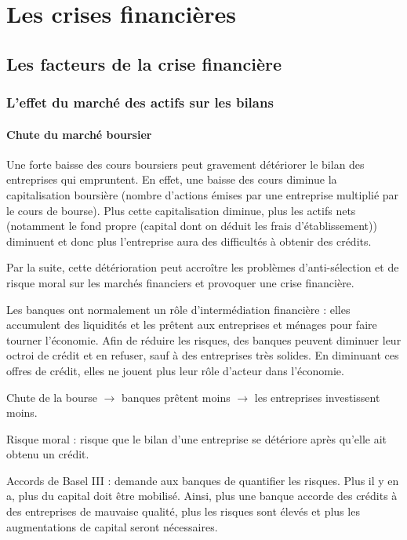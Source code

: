 \chapter{Les crises financières}

\section{Les facteurs de la crise financière}	
	
	\subsection{L'effet du marché des actifs sur les bilans}
	
		\subsubsection{Chute du marché boursier}
	
		Une forte baisse des cours boursiers peut gravement détériorer le bilan des entreprises qui empruntent. En effet, une baisse des cours diminue la capitalisation boursière (nombre d'actions émises par une entreprise multiplié par le cours de bourse). Plus cette capitalisation diminue, plus les actifs nets (notamment le fond propre (capital dont on déduit les frais d'établissement)) diminuent et donc plus l'entreprise aura des difficultés à obtenir des crédits.
	
		Par la suite, cette détérioration peut accroître les problèmes d'anti-sélection et de risque moral sur les marchés financiers et provoquer une crise financière. 
	
		Les banques ont normalement un rôle d'intermédiation financière : elles accumulent des liquidités et les prêtent aux entreprises et ménages pour faire tourner l'économie. Afin de réduire les risques, des banques peuvent diminuer leur octroi de crédit et en refuser, sauf à des entreprises très solides. En diminuant ces offres de crédit, elles ne jouent plus leur rôle d'acteur dans l'économie.
	
		Chute de la bourse $\rightarrow$ banques prêtent moins $\rightarrow$ les entreprises investissent moins.

		Risque moral : risque que le bilan d'une entreprise se détériore après qu'elle ait obtenu un crédit.
	
		Accords de Basel III : demande aux banques de quantifier les risques. Plus il y en a, plus du capital doit être mobilisé. Ainsi, plus une banque accorde des crédits à des entreprises de mauvaise qualité, plus les risques sont élevés et plus les augmentations de capital seront nécessaires.
		
